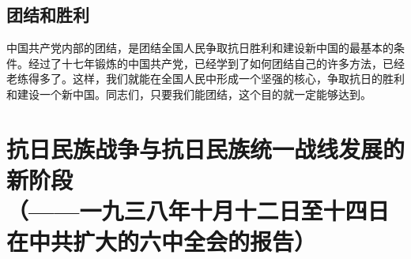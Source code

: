 \documentclass[cn,11pt,chinese]{elegantbook}
\def\myformat#1{\hfil\hfil #1}
\begin{document}
\subsection*{\myformat{团结和胜利}}
中国共产党内部的团结，是团结全国人民争取抗日胜利和建设新中国的最基本的条件。经过了十七年锻炼的中国共产党，已经学到了如何团结自己的许多方法，已经老练得多了。这样，我们就能在全国人民中形成一个坚强的核心，争取抗日的胜利和建设一个新中国。同志们，只要我们能团结，这个目的就一定能够达到。\\

\newpage
\section*{\myformat{抗日民族战争与抗日民族统一战线发展的新阶段}\\\myformat{（——一九三八年十月十二日至十四日在中共扩大的六中全会的报告）}}
\end{document}
